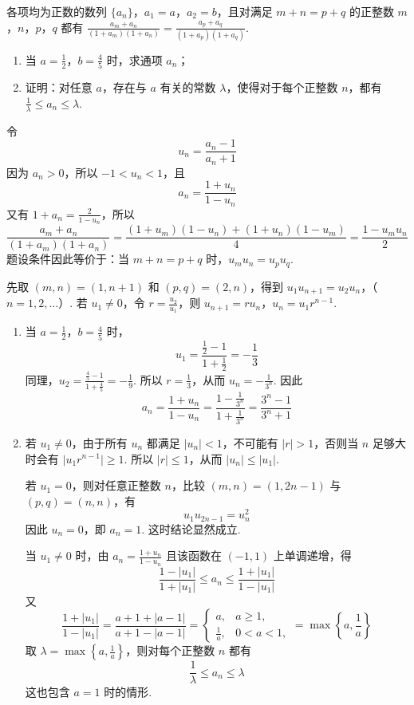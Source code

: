 \begin{problem}
各项均为正数的数列 \(\{a_{n}\}\)，\(a_{1} = a\)，\(a_{2} = b\)，且对满足 \(m + n = p + q\) 的正整数 \(m\)，\(n\)，\(p\)，\(q\) 都有 \(\frac{a_{m} + a_{n}}{(1 + a_{m})(1 + a_{n})} = \frac{a_{p} + a_{q}}{(1 + a_{p})(1 + a_{q})}\).

\begin{enumerate}
\item 当 \(a = \frac{1}{2}\)，\(b = \frac{4}{5}\) 时，求通项 \(a_{n}\)；
\item 证明：对任意 \(a\)，存在与 \(a\) 有关的常数 \(\lambda\)，使得对于每个正整数 \(n\)，都有 \(\frac{1}{\lambda} \leqslant a_n \leqslant \lambda\).
\end{enumerate}
\end{problem}

\begin{solution}
令
\[
u_{n}=\frac{a_{n}-1}{a_{n}+1}
\]
因为 \(a_{n}>0\)，所以 \(-1<u_{n}<1\)，且
\[
a_{n}=\frac{1+u_{n}}{1-u_{n}}
\]
又有 \(1+a_{n}=\frac{2}{1-u_{n}}\)，所以
\[
\frac{a_{m}+a_{n}}{(1+a_{m})(1+a_{n})}
=\frac{(1+u_{m})(1-u_{n})+(1+u_{n})(1-u_{m})}{4}
=\frac{1-u_{m}u_{n}}{2}
\]
题设条件因此等价于：当 \(m+n=p+q\) 时，\(u_{m}u_{n}=u_{p}u_{q}\).

先取 \((m,n)=(1,n+1)\) 和 \((p,q)=(2,n)\)，得到
\(u_{1}u_{n+1}=u_{2}u_{n}\)，（\(n=1,2,\ldots\)）.
若 \(u_{1}\neq0\)，令 \(r=\frac{u_{2}}{u_{1}}\)，则
\(u_{n+1}=ru_{n}\)，\(u_{n}=u_{1}r^{n-1}\).
\begin{enumerate}
\item
当 \(a=\frac12\)，\(b=\frac45\) 时，
\[
u_{1}=\frac{\frac12-1}{1+\frac12}=-\frac13
\]
同理，\(u_{2}=\frac{\frac45-1}{1+\frac45}=-\frac19\).
所以 \(r=\frac13\)，从而 \(u_{n}=-\frac{1}{3^{n}}\). 因此
\[
a_{n}=\frac{1+u_{n}}{1-u_{n}}=\frac{1-\frac1{3^{n}}}{1+\frac1{3^{n}}}
=\frac{3^{n}-1}{3^{n}+1}
\]

\item
若 \(u_{1}\neq0\)，由于所有 \(u_{n}\) 都满足 \(\lvert u_{n}\rvert<1\)，不可能有 \(\lvert r\rvert>1\)，否则当 \(n\) 足够大时会有 \(\lvert u_{1}r^{n-1}\rvert\geqslant1\). 所以 \(\lvert r\rvert\leqslant1\)，从而
\(\lvert u_{n}\rvert\leqslant\lvert u_{1}\rvert\).

若 \(u_{1}=0\)，则对任意正整数 \(n\)，比较 \((m,n)=(1,2n-1)\) 与 \((p,q)=(n,n)\)，有
\[
u_{1}u_{2n-1}=u_{n}^{2}
\]
因此 \(u_{n}=0\)，即 \(a_{n}=1\). 这时结论显然成立.

当 \(u_{1}\neq0\) 时，由 \(a_{n}=\frac{1+u_{n}}{1-u_{n}}\) 且该函数在 \((-1,1)\) 上单调递增，得
\[
\frac{1-\lvert u_{1}\rvert}{1+\lvert u_{1}\rvert}
\leqslant a_{n}\leqslant
\frac{1+\lvert u_{1}\rvert}{1-\lvert u_{1}\rvert}
\]
又
\[
\frac{1+\lvert u_{1}\rvert}{1-\lvert u_{1}\rvert}
=\frac{a+1+\lvert a-1\rvert}{a+1-\lvert a-1\rvert}
=\begin{cases}
a,&a\geqslant1,\\
\frac1a,&0<a<1,
\end{cases}
=\max\left\{a,\frac1a\right\}
\]
取
\(\lambda=\max\left\{a,\frac1a\right\}\)，则对每个正整数 \(n\) 都有
\[
\frac1\lambda\leqslant a_{n}\leqslant\lambda
\]
这也包含 \(a=1\) 时的情形.
\end{enumerate}
\end{solution}
